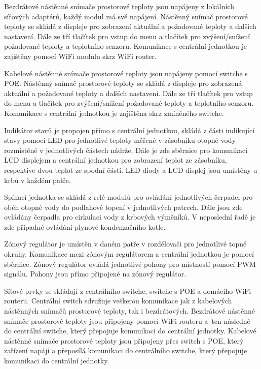 Bezdrátové nástěnné snímače prostorové teploty jsou napájeny z lokálních síťových adaptérů, každý modul má své napájení. Nástěnný snímač prostorové teploty se skládá z displeje pro zobrazení aktuální a požadované teploty a dalších nastavení. Dále ze tří tlačítek pro vstup do menu a tlačítek pro zvýšení/snížení požadované teploty a teplotního senzoru. Komunikace s centrální jednotkou je zajištěny pomocí WiFi modulu skrz WiFi router.

Kabelové nástěnné snímače prostorové teploty jsou napájeny pomocí switche s POE. Nástěnný snímač prostorové teploty se skládá z displeje pro zobrazená aktuální a požadované teploty a dalších nastavení. Dále ze tří tlačítek pro vstup do menu a tlačítek pro zvýšení/snížení požadované teploty a teplotního senzoru. Komunikace s centrální jednotkou je zajištěna skrz zmíněného switche.

Indikátor stavů je propojen přímo s centrální jednotkou, skládá z části indikující stavy pomocí LED pro jednotlivé teploty měřené v zásobníku otopné vody rozmístěné v jednotlivých částech nádrže. Dále je zde sběrnice pro komunikaci LCD displejem a centrální jednotkou pro zobrazení teplot ze zásobníku, respektive dvou teplot ze spodní části. LED diody a LCD displej jsou umístěny u krbů v každém patře.

Spínací jednotka se skládá z relé modulů pro ovládání jednotlivých čerpadel pro oběh otopné vody do podlahové topení v jednotlivých patrech. Dále jsou zde ovládány čerpadla pro cirkulaci vody z krbových výměníků. V neposlední řadě je zde případné ovládání plynové kondenzačního kotle.

Zónový regulátor je umístěn v daném patře v rozdělovači pro jednotlivé topné okruhy. Komunikace mezi zónovým regulátorem a centrální jednotkou je pomocí sběrnice. Zónový regulátor ovládá jednotlivé pohony pro místností pomocí PWM signálu. Pohony jsou přímo připojené na zónový regulátor.

Síťové prvky se skládají z centrálního switche, switche s POE a domácího WiFi routeru. Centrální switch sdružuje veškerou komunikace jak z kabelových nástěnných snímačů prostorové teploty, tak i bezdrátových. Bezdrátové nástěnné snímače prostorové teploty jsou připojeny pomocí WiFi routeru a~ten následně do centrální switche, který přepojuje komunikaci do centrální jednotky. Kabelové nástěnné snímače prostorové teploty jsou připojeny přes switch s POE, který zařízení napájí a přeposílá komunikaci do centrálního switche, který přepojuje komunikaci do centrální jednotky.

